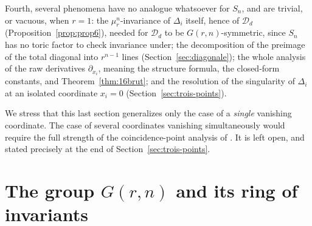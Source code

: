 \documentclass[11pt]{article}
\theoremstyle{remark}
\begin{document}
Fourth, several phenomena have no analogue whatsoever for $S_n$, and are trivial, or vacuous, when $r=1$: the $\mu_r^n$-invariance of $\Delta_i$ itself, hence of $\mathcal D_d$ (Proposition~\ref{prop:prop6}), needed for $\mathcal D_d$ to be $G(r,n)$-symmetric, since $S_n$ has no toric factor to check invariance under; the decomposition of the preimage of the total diagonal into $r^{n-1}$ lines (Section~\ref{sec:diagonale}); the whole analysis of the raw derivatives $\partial_{x_i}$, meaning the structure formula, the closed-form constants, and Theorem~\ref{thm:16brut}; and the resolution of the singularity of $\Delta_i$ at an isolated coordinate $x_i=0$ (Section~\ref{sec:trois-points}).

We stress that this last section generalizes only the case of a \emph{single} vanishing coordinate. The case of several coordinates vanishing simultaneously would require the full strength of the coincidence-point analysis of \cite[\S3]{Ze}. It is left open, and stated precisely at the end of Section~\ref{sec:trois-points}.

\section{The group $G(r,n)$ and its ring of invariants}
\end{document}
